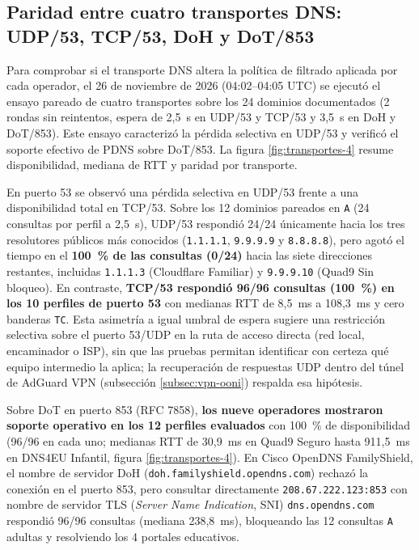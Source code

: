 \documentclass[10pt,a4paper]{article}
\begin{document}
\subsection{Paridad entre cuatro transportes DNS: UDP/53, TCP/53, DoH y DoT/853}\label{subsec:transportes}

Para comprobar si el transporte DNS altera la política de filtrado aplicada por cada operador, el 26 de noviembre de 2026 (04:02--04:05 UTC) se ejecutó el ensayo pareado de cuatro transportes sobre los 24 dominios documentados (2 rondas sin reintentos, espera de 2,5~s en UDP/53 y TCP/53 y 3,5~s en DoH y DoT/853). Este ensayo caracterizó la pérdida selectiva en UDP/53 y verificó el soporte efectivo de PDNS sobre DoT/853. La figura \ref{fig:transportes-4} resume disponibilidad, mediana de RTT y paridad por transporte.

En puerto 53 se observó una pérdida selectiva en UDP/53 frente a una disponibilidad total en TCP/53. Sobre los 12 dominios pareados en \texttt{A} (24 consultas por perfil a 2,5~s), UDP/53 respondió 24/24 únicamente hacia los tres resolutores públicos más conocidos (\texttt{1.1.1.1}, \texttt{9.9.9.9} y \texttt{8.8.8.8}), pero agotó el tiempo en el \textbf{100~\% de las consultas (0/24)} hacia las siete direcciones restantes, incluidas \texttt{1.1.1.3} (Cloudflare Familiar) y \texttt{9.9.9.10} (Quad9 Sin bloqueo). En contraste, \textbf{TCP/53 respondió 96/96 consultas (100~\%) en los 10 perfiles de puerto 53} con medianas RTT de 8,5~ms a 108,3~ms y cero banderas \texttt{TC}. Esta asimetría a igual umbral de espera sugiere una restricción selectiva sobre el puerto 53/UDP en la ruta de acceso directa (red local, encaminador o ISP), sin que las pruebas permitan identificar con certeza qué equipo intermedio la aplica; la recuperación de respuestas UDP dentro del túnel de AdGuard VPN (subsección \ref{subsec:vpn-ooni}) respalda esa hipótesis.

Sobre DoT en puerto 853 (RFC 7858), \textbf{los nueve operadores mostraron soporte operativo en los 12 perfiles evaluados} con 100~\% de disponibilidad (96/96 en cada uno; medianas RTT de 30,9~ms en Quad9 Seguro hasta 911,5~ms en DNS4EU Infantil, figura \ref{fig:transportes-4}). En Cisco OpenDNS FamilyShield, el nombre de servidor DoH (\texttt{doh.familyshield.opendns.com}) rechazó la conexión en el puerto 853, pero consultar directamente \texttt{208.67.222.123:853} con nombre de servidor TLS (\emph{Server Name Indication}, SNI) \texttt{dns.opendns.com} respondió 96/96 consultas (mediana 238,8~ms), bloqueando las 12 consultas \texttt{A} adultas y resolviendo los 4 portales educativos.
\end{document}
